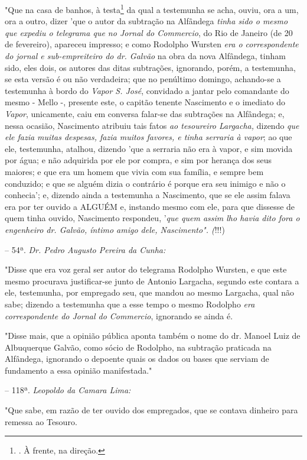 "Que na casa de banhos, à testa\footnote{. À frente, na direção.} da
qual a testemunha se acha, ouviu, ora a um, ora a outro, dizer 'que o
autor da subtração na Alfândega \emph{tinha sido o mesmo que expediu o
telegrama que no Jornal do Commercio}, do Rio de Janeiro (de 20 de
fevereiro), apareceu impresso; e como Rodolpho Wursten \emph{era o
correspondente do jornal e sub-empreiteiro do dr. Galvão} na obra da
nova Alfândega, tinham sido, eles dois, os autores das ditas subtrações,
ignorando, porém, a testemunha, se esta versão é ou não verdadeira; que
no penúltimo domingo, achando-se a testemunha à bordo do \emph{Vapor S.
José}, convidado a jantar pelo comandante do mesmo - Mello -, presente
este, o capitão tenente Nascimento e o imediato do \emph{Vapor},
unicamente, caiu em conversa falar-se das subtrações na Alfândega; e,
nessa ocasião, Nascimento atribuiu tais fatos \emph{ao tesoureiro
Largacha,} dizendo \emph{que ele fazia muitas despesas, fazia muitos
favores, e tinha serraria à vapor}; ao que ele, testemunha, atalhou,
dizendo 'que a serraria não era à vapor, e sim movida por água; e não
adquirida por ele por compra, e sim por herança dos seus maiores; e que
era um homem que vivia com sua família, e sempre bem conduzido; e que se
alguém dizia o contrário é porque era seu inimigo e não o conhecia'; e,
dizendo ainda a testemunha a Nascimento, que se ele assim falava era por
ter ouvido a ALGUÉM e, instando mesmo com ele, para que dissesse de quem
tinha ouvido, Nascimento respondeu, '\emph{que quem assim lho havia dito
fora o engenheiro dr. Galvão, íntimo amigo dele, Nascimento". (}!!!)

-- 54ª. \emph{Dr. Pedro Augusto Pereira da Cunha:}

"Disse que era voz geral ser autor do telegrama Rodolpho Wursten, e que
este mesmo procurava justificar-se junto de Antonio Largacha, segundo
este contara a ele, testemunha, por empregado seu, que mandou ao mesmo
Largacha, qual não sabe; dizendo a testemunha que a esse tempo o mesmo
Rodolpho \emph{era correspondente do Jornal do Commercio}, ignorando se
ainda é.

"Disse mais, que a opinião pública aponta também o nome do dr. Manoel
Luiz de Albuquerque Galvão, como sócio de Rodolpho, na subtração
praticada na Alfândega, ignorando o depoente quais os dados ou bases que
serviam de fundamento a essa opinião manifestada."

-- 118ª. \emph{Leopoldo da Camara Lima:}

"Que sabe, em razão de ter ouvido dos empregados, que se contava
dinheiro para remessa ao Tesouro.

